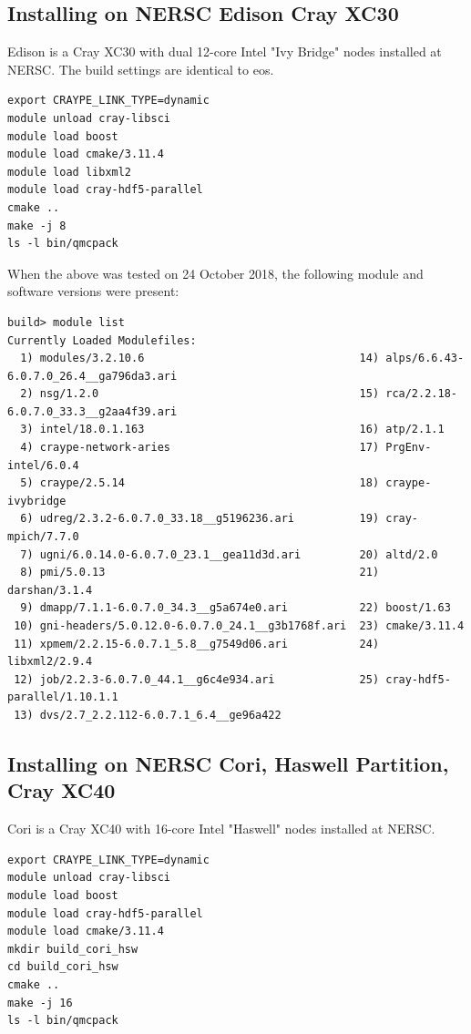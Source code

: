 \subsection{Installing on NERSC Edison Cray XC30}

Edison is a Cray XC30 with dual 12-core Intel "Ivy Bridge" nodes
installed at NERSC. The build settings are identical to eos.

\verbatimfont{\footnotesize}
\begin{verbatim}
export CRAYPE_LINK_TYPE=dynamic
module unload cray-libsci
module load boost
module load cmake/3.11.4
module load libxml2
module load cray-hdf5-parallel
cmake ..
make -j 8
ls -l bin/qmcpack
\end{verbatim}
When the above was tested on 24 October 2018, the following module and
software versions were present:
\verbatimfont{\footnotesize}
\begin{verbatim}
build> module list
Currently Loaded Modulefiles:
  1) modules/3.2.10.6                                 14) alps/6.6.43-6.0.7.0_26.4__ga796da3.ari
  2) nsg/1.2.0                                        15) rca/2.2.18-6.0.7.0_33.3__g2aa4f39.ari
  3) intel/18.0.1.163                                 16) atp/2.1.1
  4) craype-network-aries                             17) PrgEnv-intel/6.0.4
  5) craype/2.5.14                                    18) craype-ivybridge
  6) udreg/2.3.2-6.0.7.0_33.18__g5196236.ari          19) cray-mpich/7.7.0
  7) ugni/6.0.14.0-6.0.7.0_23.1__gea11d3d.ari         20) altd/2.0
  8) pmi/5.0.13                                       21) darshan/3.1.4
  9) dmapp/7.1.1-6.0.7.0_34.3__g5a674e0.ari           22) boost/1.63
 10) gni-headers/5.0.12.0-6.0.7.0_24.1__g3b1768f.ari  23) cmake/3.11.4
 11) xpmem/2.2.15-6.0.7.1_5.8__g7549d06.ari           24) libxml2/2.9.4
 12) job/2.2.3-6.0.7.0_44.1__g6c4e934.ari             25) cray-hdf5-parallel/1.10.1.1
 13) dvs/2.7_2.2.112-6.0.7.1_6.4__ge96a422

\end{verbatim}

\subsection{Installing on NERSC Cori, Haswell Partition, Cray XC40}
Cori is a Cray XC40 with 16-core Intel "Haswell" nodes
installed at NERSC.

\verbatimfont{\footnotesize}
\begin{verbatim}
export CRAYPE_LINK_TYPE=dynamic
module unload cray-libsci
module load boost
module load cray-hdf5-parallel
module load cmake/3.11.4
mkdir build_cori_hsw
cd build_cori_hsw
cmake ..
make -j 16
ls -l bin/qmcpack
\end{verbatim}

